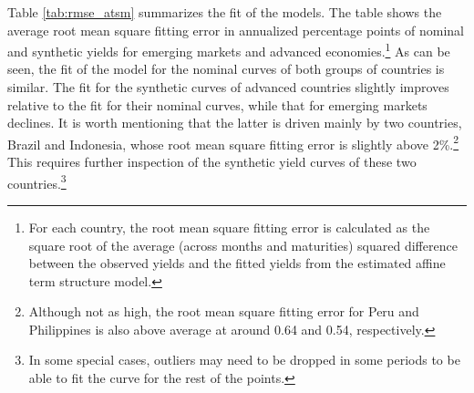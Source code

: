 Table \ref{tab:rmse_atsm} summarizes the fit of the models. The table shows the average root mean square fitting error in annualized percentage points of nominal and synthetic yields for emerging markets and advanced economies.\footnote{For each country, the root mean square fitting error is calculated as the square root of the average (across months and maturities) squared difference between the observed yields and the fitted yields from the estimated affine term structure model.} As can be seen, the fit of the model for the nominal curves of both groups of countries is similar. The fit for the synthetic curves of advanced countries slightly improves relative to the fit for their nominal curves, while that for emerging markets declines. It is worth mentioning that the latter is driven mainly by two countries, Brazil and Indonesia, whose root mean square fitting error is slightly above 2\%.\footnote{Although not as high, the root mean square fitting error for Peru and Philippines is also above average at around 0.64 and 0.54, respectively.} This requires further inspection of the synthetic yield curves of these two countries.\footnote{In some special cases, outliers may need to be dropped in some periods to be able to fit the curve for the rest of the points.} 
	
%	


